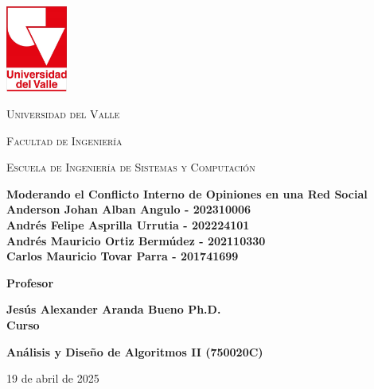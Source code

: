 \documentclass[11pt,letter]{article}
\begin{document}
    \onehalfspacing

    \begin{titlepage}
        \centering
        \includegraphics[width=0.15\textwidth]{resources/universidad-del-valle.png}\par\vspace{1cm}
        {\scshape\LARGE Universidad del Valle \par}
        {\scshape\Large Facultad de Ingeniería \par}
        {\scshape\Large Escuela de Ingeniería de Sistemas y Computación \par}
        \vspace{2cm}

        {\Large \textbf{Moderando el Conflicto Interno de Opiniones en una Red Social}}\\

        \vspace{2cm}
        {\large \textbf{Anderson Johan Alban Angulo - 202310006}}\\
        {\large \textbf{Andrés Felipe Asprilla Urrutia - 202224101 }}\\
        {\large \textbf{Andrés Mauricio Ortiz Bermúdez - 202110330}}\\
        {\large \textbf{Carlos Mauricio Tovar Parra - 201741699}}\\
        \vspace{2cm}

        \Large\textbf{Profesor}\par
        {\large \textbf{Jesús Alexander Aranda Bueno Ph.D.}}\\
        \vspace{1.4cm}
        \Large\textbf{Curso}\par
        {\large \textbf{Análisis y Diseño de Algoritmos II (750020C)}}\\
        \vspace{1cm}
        {\large {19 de abril de 2025}\par}
    \end{titlepage}

    \tableofcontents
    \newpage
    \listoftables
    \newpage
    \listoffigures
    \newpage
    \listofalgorithms
\end{document}
